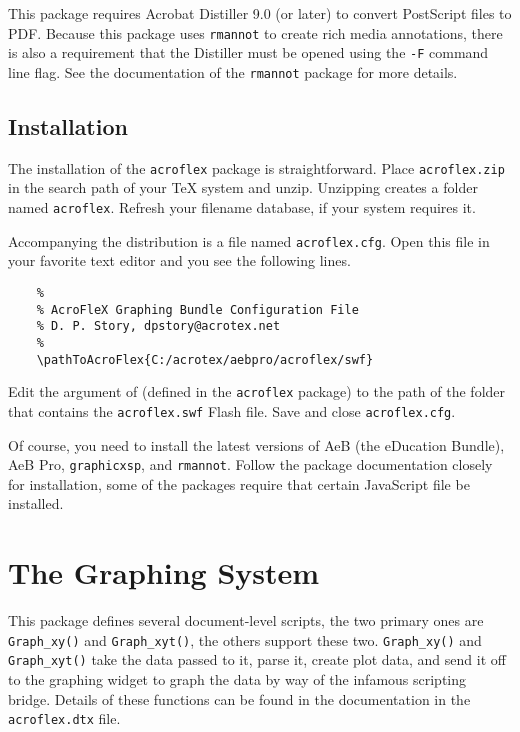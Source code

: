 \documentclass{article}
\begin{document}
This package requires Acrobat Distiller 9.0 (or later) to convert
PostScript files to PDF. Because this package uses \texttt{rmannot}
to create rich media annotations, there is also a requirement that
the Distiller must be opened using the \texttt{-F} command line
flag. See the documentation of the \texttt{rmannot} package for more
details.

\subsection{Installation}

The installation of the \texttt{acroflex} package is
straightforward. Place \texttt{acroflex.zip} in the search path of
your {\TeX} system and unzip. Unzipping creates a folder named
\texttt{acroflex}. Refresh your filename database, if your system
requires it.

Accompanying the distribution is a file named \texttt{acroflex.cfg}.
Open this file in your favorite text editor and you see the
following lines.
\begin{verbatim}
    %
    % AcroFleX Graphing Bundle Configuration File
    % D. P. Story, dpstory@acrotex.net
    %
    \pathToAcroFlex{C:/acrotex/aebpro/acroflex/swf}
\end{verbatim}
Edit the argument of  (defined in the
\texttt{acroflex} package) to the path of the folder that contains
the \texttt{acroflex.swf} Flash file. Save and close
\texttt{acroflex.cfg}.

Of course, you need to install the latest versions of AeB (the
{\AcroTeX} eDucation Bundle), AeB Pro, \texttt{graphicxsp}, and
\texttt{rmannot}. Follow the package documentation closely for
installation, some of the packages require that certain JavaScript
file be installed.


\section{The \texorpdfstring{\AcroFLeX}{AcroFLeX} Graphing System}

This package defines several document-level scripts, the two primary
ones are \texttt{Graph\_xy()} and \texttt{Graph\_xyt()}, the others
support these two. \texttt{Graph\_xy()} and \texttt{Graph\_xyt()}
take the data passed to it, parse it, create plot data, and send it
off to the {\AcroFLeX} graphing widget to graph the data by way of
the infamous scripting bridge. Details of these functions can be
found in the documentation in the \texttt{acroflex.dtx} file.
\end{document}
